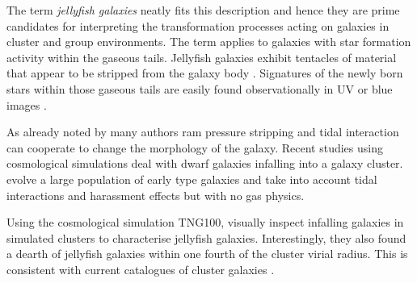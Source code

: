 The term \emph{jellyfish galaxies} \citep{Ebeling2013} neatly fits this description and hence they are prime candidates for interpreting the transformation processes acting on galaxies in cluster and group environments.
The term applies to galaxies with star formation activity within the gaseous tails.
Jellyfish galaxies exhibit tentacles of material that appear to be stripped from the galaxy body \citep{Poggianti2017a, Poggianti2019b, Ramatsoku2020}.
Signatures of the newly born stars within those gaseous tails are easily found observationally in UV or blue images \citep{Cortese2007,Smith2010a}.
\bigskip

As already noted by many authors \citep{Mayer2001, Mayer2007, Mastropietro2005} %
ram pressure stripping \citep{GunnGott1972, Roediger2008, Roediger2015} and tidal interaction can cooperate to change the morphology of the galaxy.
Recent studies using cosmological simulations deal with dwarf galaxies infalling into a galaxy cluster.
\citet{Smith2015} evolve a large population of early type galaxies and take into account tidal interactions and harassment effects but with no gas physics.


Using the cosmological simulation TNG100, \citet{Yun2018} visually inspect infalling galaxies in simulated clusters to characterise jellyfish galaxies.
Interestingly, they also found a dearth of jellyfish galaxies within one fourth of the cluster virial radius.
This is consistent with current catalogues of cluster galaxies \citep{Lisker2006, Venhola2019}.


